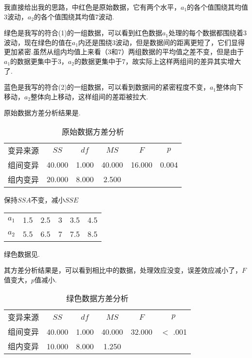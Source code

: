我直接给出我的思路，中红色是原始数据，它有两个水平，$a_1$的各个值围绕其均值3波动，$a_2$的各个值围绕其均值7波动.

绿色是我写的符合(1)的一组数据，可以看到红色数据$a_1$处理的每个数据都围绕着3波动，现在绿色的值在$a_1$内还是围绕3波动，但是数据间的距离更短了，它们显得更加紧密.虽然从组内均值上来看（3和7）两组数据的平均值之差不变，但是由于$a_1$的数据更集中于3，$a_2$的数据更集中于7，故实际上这样两组间的差异其实增大了.

蓝色是我写的符合(2)的一组数据，可以看到数据间的紧密程度不变，$a_1$整体向下移动，$a_2$整体向上移动，这样组间的差距被拉大.

原始数据方差分析结果是.

\begin{table}[h]
	\centering
	\caption{原始数据方差分析}
	{
		\begin{tabular}{cccccc}
			\toprule
			变异来源 & $SS$ & $df$ & $MS$ & $F$ & $p$  \\
			\cmidrule[0.4pt]{1-6}
			组间变异 & 40.000 & 1.000 & 40.000 & 16.000 & 0.004  \\
			组内变异 & 20.000 & 8.000 & 2.500 &  &    \\
			\bottomrule
		\end{tabular}
	}
\end{table}

\begin{margintable}
    \caption{保持$SSA$不变，减小$SSE$}
    \raggedright
    \begin{tabular}{cccccc}
        \hline
        $a_1$ & 1.5 & 2.5 & 3 & 3.5 & 4.5\\
        $a_2$ & 5.5 & 6.5 & 7 & 7.5 & 8.5\\
        \hline
    \end{tabular}
\end{margintable}

绿色数据见.


其方差分析结果是，可以看到相比中的数据，处理效应没变，误差效应减小了，$F$值变大，$p$值减小.

\begin{table}[h]
	\centering
	\caption{绿色数据方差分析}
	\label{tab:aNOVA-Score}
	{
		\begin{tabular}{cccccc}
			\toprule
			变异来源 & $SS$ & $df$ & $MS$ & $F$ & $p$  \\
			\cmidrule[0.4pt]{1-6}
			组间变异 & 40.000 & 1.000 & 40.000 & 32.000 & $<$ .001  \\
			组内变异 & 10.000 & 8.000 & 1.250 &  &    \\
			\bottomrule
		\end{tabular}
	}
\end{table}

